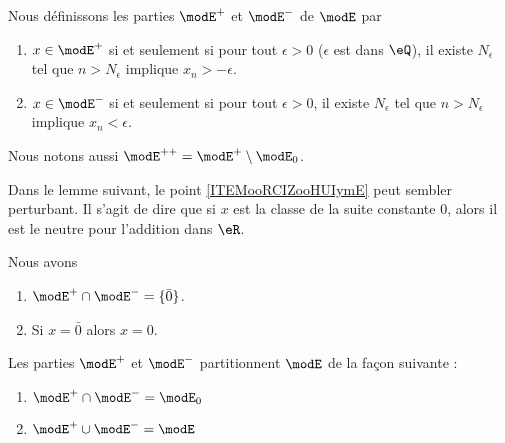 \begin{definition}
    Nous définissons les parties \( \modE^+\) et \( \modE^-\) de \( \modE\) par
    \begin{enumerate}
        \item
            \( x\in  \modE^+\) si et seulement si pour tout \( \epsilon>0\) (\( \epsilon\) est dans \( \eQ\)), il existe \( N_{\epsilon}\) tel que \( n>N_{\epsilon}\) implique \( x_n>-\epsilon\).
        \item
            \( x\in  \modE^-\) si et seulement si pour tout \( \epsilon>0\), il existe \( N_{\epsilon}\) tel que \( n>N_{\epsilon}\) implique \( x_n<\epsilon\).
    \end{enumerate}
    Nous notons aussi \( \modE^{++}=\modE^+\setminus\modE_0\).
\end{definition}


Dans le lemme suivant, le point \ref{ITEMooRCIZooHUIymE} peut sembler perturbant. Il s'agit de dire que si \( x\) est la classe de la suite constante \( 0\), alors il est le neutre pour l'addition dans \( \eR\).
\begin{lemma}       \label{LEMooJOYQooCDlhHW}
    Nous avons
    \begin{enumerate}
        \item   \label{ITEMooKRBYooZGhhch}
    \( \modE^+\cap\modE^-=\{ \bar 0 \}\).
\item       \label{ITEMooRCIZooHUIymE}
    Si \( x=\bar 0\) alors \( x=0\).
    \end{enumerate}
\end{lemma}

\begin{lemma}       \label{LEMooSWYXooMKMLYI}
    Les parties \( \modE^+\) et \( \modE^-\) partitionnent \( \modE\) de la façon suivante :
    \begin{enumerate}
        \item
            \( \modE^+\cap\modE^-=\modE_0\)
        \item       \label{ITEMooZRVXooANHspZ}
            \( \modE^+\cup\modE^-=\modE\)
    \end{enumerate}
\end{lemma}

